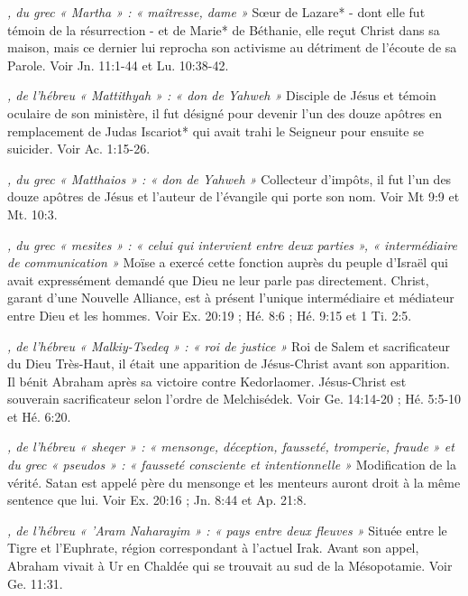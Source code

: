 \begin{multicols}{2}
{\textit{, du grec « Martha » : « maîtresse, dame »}\newline
Sœur de Lazare* - dont elle fut témoin de la résurrection - et de Marie* de Béthanie, elle reçut Christ dans sa maison, mais ce dernier lui reprocha son activisme au détriment de l'écoute de sa Parole. Voir Jn. 11:1-44 et Lu. 10:38-42.

\textit{, de l'hébreu « Mattithyah » : « don de Yahweh »}\newline
Disciple de Jésus et témoin oculaire de son ministère, il fut désigné pour devenir l'un des douze apôtres en remplacement de Judas Iscariot* qui avait trahi le Seigneur pour ensuite se suicider. Voir Ac. 1:15-26.

\textit{, du grec « Matthaios » : « don de Yahweh »}\newline
Collecteur d'impôts, il fut l'un des douze apôtres de Jésus et l'auteur de l'évangile qui porte son nom. Voir Mt 9:9 et Mt. 10:3.

\textit{, du grec « mesites » : « celui qui intervient entre deux parties », « intermédiaire de communication »}\newline
Moïse a exercé cette fonction auprès du peuple d'Israël qui avait expressément demandé que Dieu ne leur parle pas directement. Christ, garant d'une Nouvelle Alliance, est à présent l'unique intermédiaire et médiateur entre Dieu et les hommes. Voir Ex. 20:19 ; Hé. 8:6 ; Hé. 9:15 et 1 Ti. 2:5.

\textit{, de l'hébreu « Malkiy-Tsedeq » : « roi de justice »}\newline
Roi de Salem et sacrificateur du Dieu Très-Haut, il était une apparition de Jésus-Christ avant son apparition. Il bénit Abraham après sa victoire contre Kedorlaomer. Jésus-Christ est souverain sacrificateur selon l'ordre de Melchisédek. Voir Ge. 14:14-20 ; Hé. 5:5-10 et Hé. 6:20.

\textit{, de l'hébreu « sheqer » : « mensonge, déception, fausseté, tromperie, fraude » et du grec « pseudos » : « fausseté consciente et intentionnelle »}\newline
Modification de la vérité. Satan est appelé père du mensonge et les menteurs auront droit à la même sentence que lui. Voir Ex. 20:16 ; Jn. 8:44 et Ap. 21:8.

\textit{, de l'hébreu « 'Aram Naharayim » : « pays entre deux fleuves »}\newline
Située entre le Tigre et l'Euphrate, région correspondant à l'actuel Irak. Avant son appel, Abraham vivait à Ur en Chaldée qui se trouvait au sud de la Mésopotamie. Voir Ge. 11:31.

}
\end{multicols}
